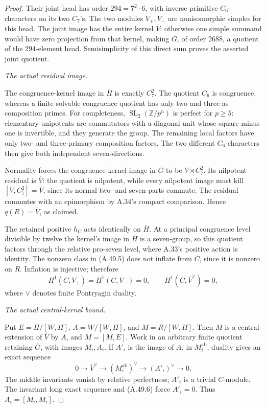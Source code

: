 \begin{proof}
Their joint head has order \(294=7^2\cdot6\),
with inverse primitive \(C_6\)-characters on
its two \(C_7\)'s. The two modules \(V_+,V_-\)
are nonisomorphic simples for this head. The
joint image has the entire kernel
\(\overline V\): otherwise one simple summand
would have zero projection from that kernel,
making \(G\), of order 2688, a quotient of
the 294-element head. Semisimplicity of this
direct sum proves the asserted joint quotient.

\emph{The actual residual image.}\par
The congruence-kernel image in \(\overline H\)
is exactly \(C_7^2\). The quotient \(C_6\)
is congruence, whereas a finite solvable
congruence quotient has only two and three
as composition primes. For completeness,
\(\operatorname{SL}_2(\mathbb Z/p^n)\) is
perfect for \(p\geq5\): elementary unipotents
are commutators with a diagonal unit whose
square minus one is invertible, and they
generate the group. The remaining local
factors have only two- and three-primary
composition factors. The two different
\(C_6\)-characters then give both independent
seven-directions.

Normality forces the congruence-kernel image
in \(\overline G\) to be
\(\overline V\rtimes C_7^2\). Its nilpotent
residual is \(\overline V\): the quotient is
nilpotent, while every nilpotent image must
kill \([\overline V,C_7^2]=\overline V\),
since its normal two- and seven-parts commute.
The residual commutes with an epimorphism by
A.34's compact comparison. Hence
\(q(R)=\overline V\), as claimed.

The retained positive \(h_C\) acts identically
on \(\overline H\). At a principal congruence
level divisible by twelve the kernel's image
in \(\overline H\) is a seven-group, so this
quotient factors through the relative pro-seven
level, where A.33's positive action is identity.
The nonzero class in (A.49.5) does not inflate
from \(C\), since it is nonzero on \(R\).
Inflation is injective; therefore
\[
 H^1(C,V_+)=H^1(C,V_-)=0,
 \qquad H^1(C,\overline V^\vee)=0,
 \tag{A.49.6}
\]
where \(\vee\) denotes finite Pontryagin duality.

\emph{The actual central-kernel bound.}\par
Put \(E=\Pi/[W,\Pi]\), \(A=W/[W,\Pi]\),
and \(M=R/[W,\Pi]\). Then \(M\) is a
central extension of \(\overline V\) by
\(A\), and \(M=[M,E]\). Work in an arbitrary
finite quotient retaining \(\overline G\),
with images \(M_i,A_i\). If \(A'_i\) is
the image of \(A_i\) in \(M_i^{\mathrm{ab}}\),
duality gives an exact sequence
\[
 0\longrightarrow\overline V^\vee
  \longrightarrow(M_i^{\mathrm{ab}})^\vee
  \longrightarrow(A'_i)^\vee\longrightarrow0.
\]
The middle invariants vanish by relative
perfectness; \(A'_i\) is a trivial \(C\)-module.
The invariant long exact sequence and
(A.49.6) force \(A'_i=0\). Thus
\(A_i=[M_i,M_i]\).


\end{proof}
